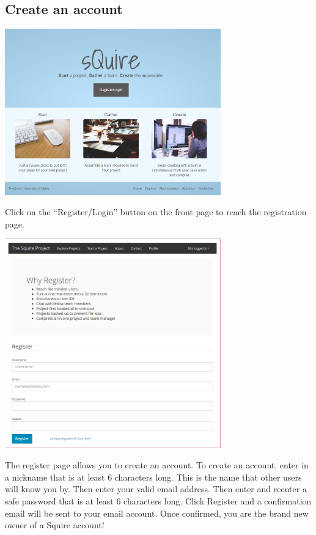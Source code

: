 \documentclass[11pt]{report}
\begin{document}
\subsection{Create an account}
	\begin{center}
           \includegraphics[width=0.7\textwidth]{userguide/frontpage}
    \end{center}
    Click on the “Register/Login” button on the front page to reach the registration page.
    \pagebreak
	\begin{center}
           \includegraphics[width=0.7\textwidth]{userguide/register}
    \end{center}
    The register page allows you to create an account. To create an account, enter in a nickname that is at least 6 characters long. This is the name that other users will know you by. Then enter your valid email address. Then enter and reenter a safe password that is at least 6 characters long. Click Register and a confirmation email will be sent to your email account. Once confirmed, you are the brand new owner of a Squire account!
\end{document}
